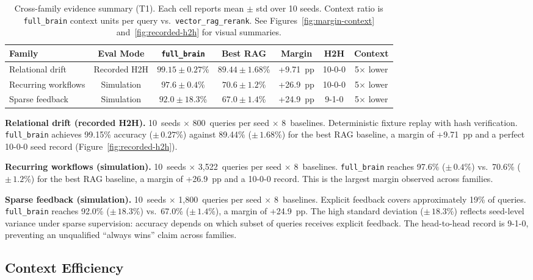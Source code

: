 \documentclass[11pt]{article}
\begin{document}
\begin{table}[h]
\centering
\small
\begin{tabular}{lcccccc}
\toprule
Family & Eval Mode & \texttt{full\_brain} & Best RAG & Margin & H2H & Context \\
\midrule
Relational drift & Recorded H2H & $99.15 \pm 0.27$\% & $89.44 \pm 1.68$\% & +9.71~pp & 10-0-0 & 5$\times$ lower \\
Recurring workflows & Simulation & $97.6 \pm 0.4$\% & $70.6 \pm 1.2$\% & +26.9~pp & 10-0-0 & 5$\times$ lower \\
Sparse feedback & Simulation & $92.0 \pm 18.3$\% & $67.0 \pm 1.4$\% & +24.9~pp & 9-1-0 & 5$\times$ lower \\
\bottomrule
\end{tabular}
\caption{Cross-family evidence summary (T1). Each cell reports mean $\pm$ std
over 10 seeds. Context ratio is \texttt{full\_brain} context units per query
vs.\ \texttt{vector\_rag\_rerank}. See Figures~\ref{fig:margin-context}
and~\ref{fig:recorded-h2h} for visual summaries.}
\label{tab:cross-family}
\end{table}

\noindent\textbf{Relational drift (recorded H2H).}
10~seeds $\times$ 800~queries per seed $\times$ 8~baselines.
Deterministic fixture replay with hash verification.
\texttt{full\_brain} achieves 99.15\% accuracy ($\pm\,0.27$\%) against
89.44\% ($\pm\,1.68$\%) for the best RAG baseline, a margin of +9.71~pp
and a perfect 10-0-0 seed record (Figure~\ref{fig:recorded-h2h}).

\noindent\textbf{Recurring workflows (simulation).}
10~seeds $\times$ 3{,}522~queries per seed $\times$ 8~baselines.
\texttt{full\_brain} reaches 97.6\% ($\pm\,0.4$\%) vs.\ 70.6\% ($\pm\,1.2$\%)
for the best RAG baseline, a margin of +26.9~pp and a 10-0-0 record.
This is the largest margin observed across families.

\noindent\textbf{Sparse feedback (simulation).}
10~seeds $\times$ 1{,}800~queries per seed $\times$ 8~baselines.
Explicit feedback covers approximately 19\% of queries.
\texttt{full\_brain} reaches 92.0\% ($\pm\,18.3$\%) vs.\ 67.0\% ($\pm\,1.4$\%),
a margin of +24.9~pp.
The high standard deviation ($\pm\,18.3$\%) reflects seed-level variance under
sparse supervision: accuracy depends on which subset of queries receives explicit
feedback. The head-to-head record is 9-1-0, preventing an unqualified
``always wins'' claim across families.

\subsection{Context Efficiency}
\label{sec:context}
\end{document}
